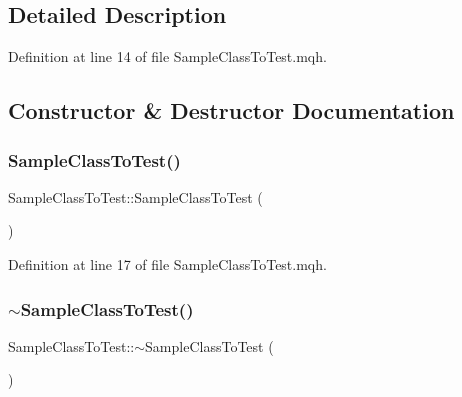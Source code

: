 \subsection{Detailed Description}


Definition at line 14 of file Sample\+Class\+To\+Test.\+mqh.



\subsection{Constructor \& Destructor Documentation}
\mbox{\label{class_sample_class_to_test_ab3aa0ae3270fcfbe452c8584533dadb3}} 
\subsubsection{\texorpdfstring{Sample\+Class\+To\+Test()}{SampleClassToTest()}}
{\footnotesize\ttfamily Sample\+Class\+To\+Test\+::\+Sample\+Class\+To\+Test (\begin{DoxyParamCaption}{ }\end{DoxyParamCaption})\hspace{0.3cm}{\ttfamily [inline]}}



Definition at line 17 of file Sample\+Class\+To\+Test.\+mqh.

\mbox{\label{class_sample_class_to_test_ab1e66b62ca5dc130dbd50ea3d9aea373}} 
\subsubsection{\texorpdfstring{$\sim$\+Sample\+Class\+To\+Test()}{~SampleClassToTest()}}
{\footnotesize\ttfamily Sample\+Class\+To\+Test\+::$\sim$\+Sample\+Class\+To\+Test (\begin{DoxyParamCaption}{ }\end{DoxyParamCaption})\hspace{0.3cm}{\ttfamily [inline]}}



